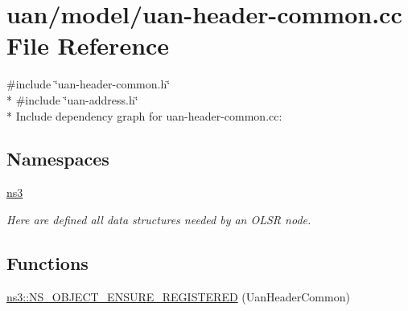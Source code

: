 \hypertarget{uan-header-common_8cc}{}\section{uan/model/uan-\/header-\/common.cc File Reference}
\label{uan-header-common_8cc}
{\ttfamily \#include \char`\"{}uan-\/header-\/common.\+h\char`\"{}}\\*
{\ttfamily \#include \char`\"{}uan-\/address.\+h\char`\"{}}\\*
Include dependency graph for uan-\/header-\/common.cc\+:
\subsection*{Namespaces}
\begin{DoxyCompactItemize}
\item 
 \hyperlink{namespacens3}{ns3}
\begin{DoxyCompactList}\small\item\em Here are defined all data structures needed by an O\+L\+SR node. \end{DoxyCompactList}\end{DoxyCompactItemize}
\subsection*{Functions}
\begin{DoxyCompactItemize}
\item 
\hyperlink{namespacens3_aaa78cef222cf5a7eb2bb96dff88e40f5}{ns3\+::\+N\+S\+\_\+\+O\+B\+J\+E\+C\+T\+\_\+\+E\+N\+S\+U\+R\+E\+\_\+\+R\+E\+G\+I\+S\+T\+E\+R\+ED} (Uan\+Header\+Common)
\end{DoxyCompactItemize}
